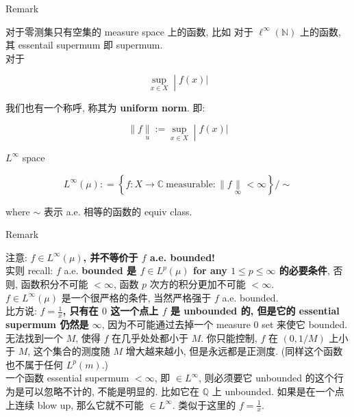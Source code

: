\documentclass{qlnotes-export}
\begin{document}
\begin{qlremark}{Remark}

对于零测集只有空集的 measure space 上的函数, 比如 对于 \(\ell^{\infty}({\mathbb{N}})\) 上的函数, 其 essentail supermum 即 supermum.\\
对于

\[\left. \sup\limits_{x \in X} \middle| f(x)| \right.\]

我们也有一个称呼, 称其为 \textbf{uniform norm}. 即:

\[\left. \parallel f\underset{u}{\parallel} := \sup\limits_{x \in X} \middle| f(x)| \right.\]

\end{qlremark}

\begin{definition}{\(L^{\infty}\) space}\label{def-09-l-p-space-and-inequalities-l-infty-space}

\[L^{\infty}(\mu): = \left\{ {f:X\rightarrow{\mathbb{C}}\ \text{measurable}: \parallel f\underset{\infty}{\parallel} < \infty} \right\}/ \sim\]

where \(\sim\) 表示 a.e. 相等的函数的 equiv class.

\end{definition}

\begin{qlremark}{Remark}

注意: \textbf{\(f \in L^{\infty}(\mu)\), 并不等价于 \(f\) a.e. bounded!}\\
实则 recall: \(f\) a.e. \textbf{bounded 是 \(f \in L^{p}(\mu)\) for any \(1 \leq p \leq \infty\) 的必要条件}, 否则, 函数积分不可能 \(< \infty\), 函数 \(p\) 次方的积分更加不可能 \(< \infty\).\\
\(f \in L^{\infty}(\mu)\) 是一个很严格的条件, 当然严格强于 \(f\) a.e. bounded.\\
比方说: \textbf{\(f = \frac{1}{x}\), 只有在 \(0\) 这一个点上 \(f\) 是 unbounded 的, 但是它的 essential supermum 仍然是 \(\infty\)}, 因为不可能通过去掉一个 measure \(0\) set 来使它 bounded.\\
无法找到一个 \(M\), 使得 \(f\) 在几乎处处都小于 \(M\). 你只能控制, \(f\) 在 \((0,1/M)\) 上小于 \(M\), 这个集合的测度随 \(M\) 增大越来越小, 但是永远都是正测度. (同样这个函数也不属于任何 \(L^{p}(m)\).)\\
一个函数 essential supermum \(< \infty\), 即 \(\in L^{\infty}\), 则必须要它 unbounded 的这个行为是可以忽略不计的, 不能是明显的. 比如它在 \(\mathbb{Q}\) 上 unbounded. 如果是在一个点上连续 blow up, 那么它就不可能 \(\in L^{\infty}\). 类似于这里的 \(f = \frac{1}{x}\).\\

\end{qlremark}
\end{document}
